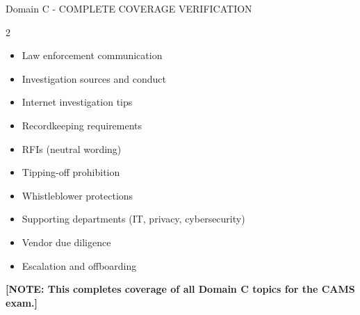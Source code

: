 \documentclass[11pt,a4paper]{beamer}
\newcommand{\bluenote}[1]{\textcolor{blue!80!black}{\textbf{[NOTE: #1]}}}
\begin{document}
\begin{frame}{Domain C - COMPLETE COVERAGE VERIFICATION}
\begin{multicols}{2}
\begin{itemize}
				\item Law enforcement communication
				\item Investigation sources and conduct
				\item Internet investigation tips
				\item Recordkeeping requirements
				\item RFIs (neutral wording)
				\item Tipping-off prohibition
				\item Whistleblower protections
				\item Supporting departments (IT, privacy, cybersecurity)
				\item Vendor due diligence
				\item Escalation and offboarding
			\end{itemize}
		\end{multicols}
		\bluenote{This completes coverage of all Domain C topics for the CAMS exam.}
	\end{frame}
	
\end{document}
